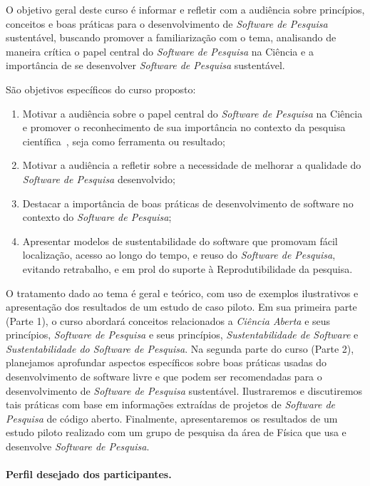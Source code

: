 O objetivo geral deste curso é informar e refletir com a audiência sobre princípios, conceitos e boas práticas para o desenvolvimento de \textit{Software de Pesquisa} sustentável, buscando promover a familiarização com o tema, analisando de maneira crítica o papel central do \textit{Software de Pesquisa} na Ciência e a importância de se desenvolver \textit{Software de Pesquisa} sustentável.

São objetivos específicos do curso proposto:
\begin{enumerate}
    \item Motivar a audiência sobre o papel central do \textit{Software de Pesquisa} na Ciência e promover o reconhecimento de sua importância no contexto da pesquisa científica~\cite{goble2014better}, seja como ferramenta ou resultado;
    \item Motivar a audiência a refletir sobre a necessidade de melhorar a qualidade do \textit{Software de Pesquisa} desenvolvido;
    \item Destacar a importância de boas práticas de desenvolvimento de software no contexto do \textit{Software de Pesquisa};
    \item Apresentar modelos de sustentabilidade do software que promovam fácil localização, acesso ao longo do tempo, e reuso do \textit{Software de Pesquisa}, evitando retrabalho, e em prol do  suporte à Reprodutibilidade da pesquisa.
\end{enumerate}

O tratamento dado ao tema é geral e teórico, com uso de exemplos ilustrativos e apresentação dos resultados de um estudo de caso piloto.
%
Em sua primeira parte (Parte 1), o curso abordará conceitos relacionados a \textit{Ciência Aberta} e seus princípios, \textit{Software de Pesquisa} e seus princípios, \textit{Sustentabilidade de Software} e \textit{Sustentabilidade do Software de Pesquisa}.
%
Na segunda parte do curso (Parte 2),  
planejamos aprofundar aspectos específicos sobre boas práticas usadas do desenvolvimento de software livre e que podem ser recomendadas para o desenvolvimento de \textit{Software de Pesquisa} sustentável. 
Ilustraremos e discutiremos tais práticas com base em informações extraídas de projetos de \textit{Software de Pesquisa} de código aberto.
Finalmente, apresentaremos os resultados de um estudo piloto realizado com um grupo de pesquisa da área de Física que usa e desenvolve  \textit{Software de Pesquisa}.

\noindent\paragraph*{Perfil desejado dos participantes.}

